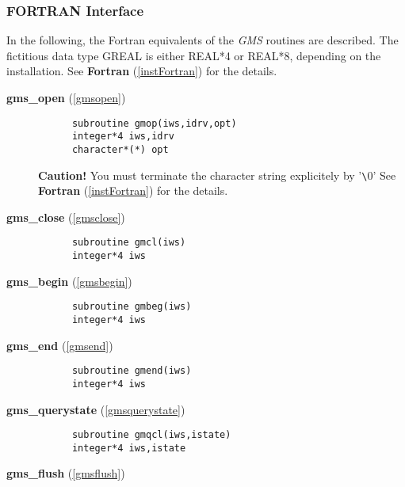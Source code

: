 \subsubsection{FORTRAN Interface\label{Fortran}}In the following, the Fortran equivalents of the {\em GMS\/} routines
are described. The fictitious data type GREAL is either
REAL*4 or REAL*8, depending on the installation.
See 
{\bf Fortran} (\ref{instFortran}) for the  details.
\begin{description}
 
\item[
{\bf gms\_open} (\ref{gmsopen})]\mbox{}


\begin{verbatim}
      subroutine gmop(iws,idrv,opt)
      integer*4 iws,idrv
      character*(*) opt
\end{verbatim}

{\bf Caution!} You must terminate the character string explicitely 
by '\verb+\+0'
See 
{\bf Fortran} (\ref{instFortran}) for the  details.




\item[
{\bf gms\_close} (\ref{gmsclose})]\mbox{}


\begin{verbatim}
      subroutine gmcl(iws)
      integer*4 iws
\end{verbatim}


\item[
{\bf gms\_begin} (\ref{gmsbegin})]\mbox{}


\begin{verbatim}
      subroutine gmbeg(iws)
      integer*4 iws
\end{verbatim}


\item[
{\bf gms\_end} (\ref{gmsend})]\mbox{}



\begin{verbatim}
      subroutine gmend(iws)
      integer*4 iws
\end{verbatim}


\item[
{\bf gms\_querystate} (\ref{gmsquerystate})]\mbox{}


\begin{verbatim}
      subroutine gmqcl(iws,istate)
      integer*4 iws,istate
\end{verbatim}


\item[
{\bf gms\_flush} (\ref{gmsflush})]\mbox{}



\end{description}
